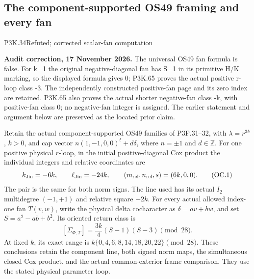 \subsection{The component-supported OS49 framing and every fan}
\begin{statement}{P3K.34}{Refuted; corrected scalar-fan computation}
\par\noindent\textbf{Audit correction, 17 November 2026.} The universal OS49 fan formula is false. For k=1 the original negative-diagonal fan has S=1 in its primitive H/K marking, so the displayed formula gives 0; P3K.65 proves the actual positive r-loop class -3. The independently constructed positive-fan page and its zero index are retained. P3K.65 also proves the actual shorter negative-fan class -k, with positive-fan class 0; no negative-fan integer is assigned. The earlier statement and argument below are preserved as the located prior claim.
\medskip


Retain the actual component-supported OS49 families of P3F.31--32,
with \(\lambda=r^{3k}\), \(k>0\), and cap vector
\(n(1,-1,0,0)^t+d\delta\), where \(n=\pm1\) and \(d\in\mathbb Z\).
For one positive physical \(r\)-loop, in the initial positive-diagonal
Cox product the individual integers and relative coordinates are
\[
 k_{\rm Jin}=-6k,\qquad \ell_{\rm Jin}=-24k,\qquad
 (m_{\rm rel},n_{\rm rel},s)=(6k,0,0).
 \tag{OC.1}
\]
The pair is the same for both norm signs. The line used has its actual
\(I_2\) multidegree \((-1,+1)\) and relative square \(-2k\).
For every actual allowed index-one fan \(T(v,w)\), write the physical
delta cocharacter as \(\delta=a v+b w\), and set \(S=a^2-ab+b^2\).
Its oriented return class is
\[
 [\Sigma_{\Phi,T}]=\frac{3k}{4}(S-1)(S-3)\pmod{28}.
 \tag{OC.2}
\]
At fixed \(k\), its exact range is
\(k\{0,4,6,8,14,18,20,22\}\pmod{28}\).
These conclusions retain the component line, both signed norm maps,
the simultaneous closed Cox product, and the actual common-exterior
frame comparison. They use the stated physical parameter loop.

\end{statement}
